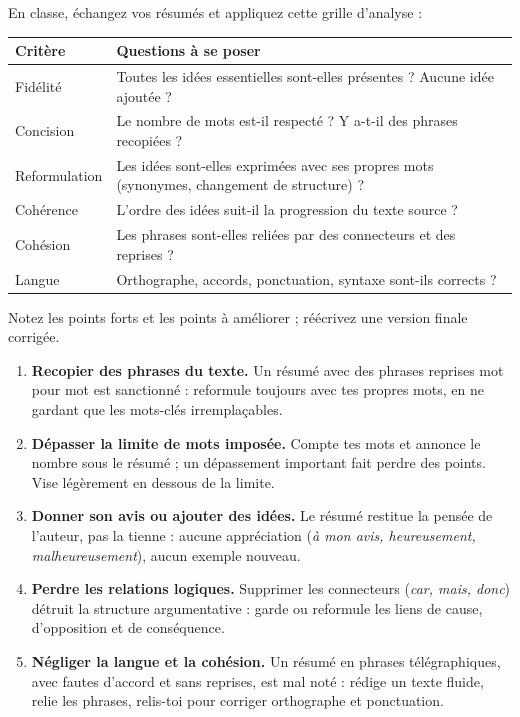 \documentclass[11pt]{article}
\begin{document}
\begin{methode}
En classe, échangez vos résumés et appliquez cette grille d'analyse :
\begin{center}
\begin{tabularx}{\linewidth}{|l|X|}\hline
\textbf{Critère} & \textbf{Questions à se poser} \\ \hline
Fidélité & Toutes les idées essentielles sont-elles présentes ? Aucune idée ajoutée ? \\ \hline
Concision & Le nombre de mots est-il respecté ? Y a-t-il des phrases recopiées ? \\ \hline
Reformulation & Les idées sont-elles exprimées avec ses propres mots (synonymes, changement de structure) ? \\ \hline
Cohérence & L'ordre des idées suit-il la progression du texte source ? \\ \hline
Cohésion & Les phrases sont-elles reliées par des connecteurs et des reprises ? \\ \hline
Langue & Orthographe, accords, ponctuation, syntaxe sont-ils corrects ? \\ \hline
\end{tabularx}
\end{center}
Notez les points forts et les points à améliorer ; réécrivez une version finale corrigée.
\end{methode}

\begin{attention}
\begin{enumerate}
\item \textbf{Recopier des phrases du texte.} Un résumé avec des phrases reprises mot pour mot est sanctionné : reformule toujours avec tes propres mots, en ne gardant que les mots-clés irremplaçables.
\item \textbf{Dépasser la limite de mots imposée.} Compte tes mots et annonce le nombre sous le résumé ; un dépassement important fait perdre des points. Vise légèrement en dessous de la limite.
\item \textbf{Donner son avis ou ajouter des idées.} Le résumé restitue la pensée de l'auteur, pas la tienne : aucune appréciation (\emph{à mon avis, heureusement, malheureusement}), aucun exemple nouveau.
\item \textbf{Perdre les relations logiques.} Supprimer les connecteurs (\emph{car, mais, donc}) détruit la structure argumentative : garde ou reformule les liens de cause, d'opposition et de conséquence.
\item \textbf{Négliger la langue et la cohésion.} Un résumé en phrases télégraphiques, avec fautes d'accord et sans reprises, est mal noté : rédige un texte fluide, relie les phrases, relis-toi pour corriger orthographe et ponctuation.
\end{enumerate}
\end{attention}
\end{document}

